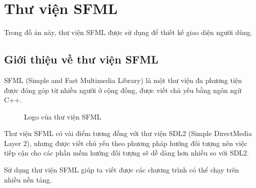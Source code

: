 \section{Thư viện SFML}
Trong đồ án này, thư viện SFML được sử dụng để thiết kế giao diện người dùng.

\subsection{Giới thiệu về thư viện SFML}
SFML (Simple and Fast Multimedia Library) là một thư viện đa phương tiện được đóng góp từ nhiều người ở cộng đồng, được viết chủ yếu bằng ngôn ngữ C++.

\begin{figure}[H]
\caption{Logo của thư viện SFML}
\end{figure}

Thư viện SFML có vài điểm tương đồng với thư viện SDL2 (Simple DirectMedia Layer 2), nhưng được viết chủ yếu theo phương pháp hướng đối tượng nên việc tiếp cận cho các phần mềm hướng đối tượng sẽ dễ dàng hơn nhiều so với SDL2.

Sử dụng thư viện SFML giúp ta viết được các chương trình có thể chạy trên nhiều nền tảng.

